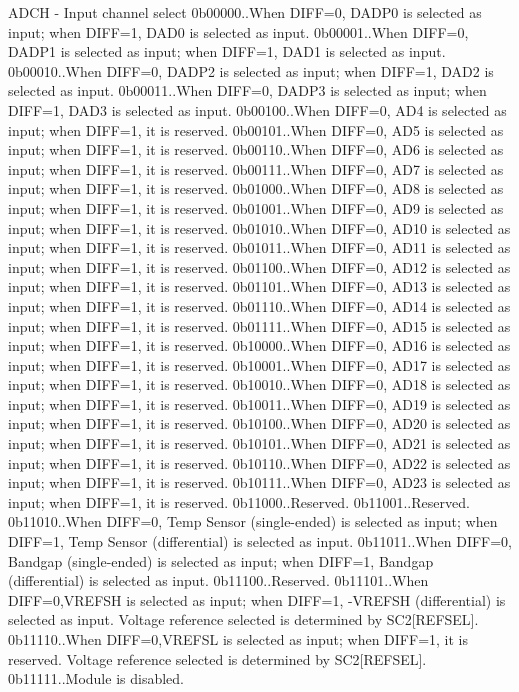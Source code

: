 A\+D\+CH -\/ Input channel select 0b00000..When D\+I\+FF=0, D\+A\+D\+P0 is selected as input; when D\+I\+FF=1, D\+A\+D0 is selected as input. 0b00001..When D\+I\+FF=0, D\+A\+D\+P1 is selected as input; when D\+I\+FF=1, D\+A\+D1 is selected as input. 0b00010..When D\+I\+FF=0, D\+A\+D\+P2 is selected as input; when D\+I\+FF=1, D\+A\+D2 is selected as input. 0b00011..When D\+I\+FF=0, D\+A\+D\+P3 is selected as input; when D\+I\+FF=1, D\+A\+D3 is selected as input. 0b00100..When D\+I\+FF=0, A\+D4 is selected as input; when D\+I\+FF=1, it is reserved. 0b00101..When D\+I\+FF=0, A\+D5 is selected as input; when D\+I\+FF=1, it is reserved. 0b00110..When D\+I\+FF=0, A\+D6 is selected as input; when D\+I\+FF=1, it is reserved. 0b00111..When D\+I\+FF=0, A\+D7 is selected as input; when D\+I\+FF=1, it is reserved. 0b01000..When D\+I\+FF=0, A\+D8 is selected as input; when D\+I\+FF=1, it is reserved. 0b01001..When D\+I\+FF=0, A\+D9 is selected as input; when D\+I\+FF=1, it is reserved. 0b01010..When D\+I\+FF=0, A\+D10 is selected as input; when D\+I\+FF=1, it is reserved. 0b01011..When D\+I\+FF=0, A\+D11 is selected as input; when D\+I\+FF=1, it is reserved. 0b01100..When D\+I\+FF=0, A\+D12 is selected as input; when D\+I\+FF=1, it is reserved. 0b01101..When D\+I\+FF=0, A\+D13 is selected as input; when D\+I\+FF=1, it is reserved. 0b01110..When D\+I\+FF=0, A\+D14 is selected as input; when D\+I\+FF=1, it is reserved. 0b01111..When D\+I\+FF=0, A\+D15 is selected as input; when D\+I\+FF=1, it is reserved. 0b10000..When D\+I\+FF=0, A\+D16 is selected as input; when D\+I\+FF=1, it is reserved. 0b10001..When D\+I\+FF=0, A\+D17 is selected as input; when D\+I\+FF=1, it is reserved. 0b10010..When D\+I\+FF=0, A\+D18 is selected as input; when D\+I\+FF=1, it is reserved. 0b10011..When D\+I\+FF=0, A\+D19 is selected as input; when D\+I\+FF=1, it is reserved. 0b10100..When D\+I\+FF=0, A\+D20 is selected as input; when D\+I\+FF=1, it is reserved. 0b10101..When D\+I\+FF=0, A\+D21 is selected as input; when D\+I\+FF=1, it is reserved. 0b10110..When D\+I\+FF=0, A\+D22 is selected as input; when D\+I\+FF=1, it is reserved. 0b10111..When D\+I\+FF=0, A\+D23 is selected as input; when D\+I\+FF=1, it is reserved. 0b11000..Reserved. 0b11001..Reserved. 0b11010..When D\+I\+FF=0, Temp Sensor (single-\/ended) is selected as input; when D\+I\+FF=1, Temp Sensor (differential) is selected as input. 0b11011..When D\+I\+FF=0, Bandgap (single-\/ended) is selected as input; when D\+I\+FF=1, Bandgap (differential) is selected as input. 0b11100..Reserved. 0b11101..When D\+I\+FF=0,V\+R\+E\+F\+SH is selected as input; when D\+I\+FF=1, -\/V\+R\+E\+F\+SH (differential) is selected as input. Voltage reference selected is determined by S\+C2\mbox{[}R\+E\+F\+S\+EL\mbox{]}. 0b11110..When D\+I\+FF=0,V\+R\+E\+F\+SL is selected as input; when D\+I\+FF=1, it is reserved. Voltage reference selected is determined by S\+C2\mbox{[}R\+E\+F\+S\+EL\mbox{]}. 0b11111..Module is disabled. \mbox{\label{group___a_d_c___register___masks_ga63500f6af77c0494e67395a35716285b}} 
